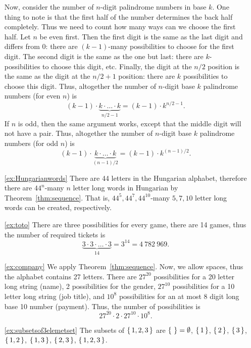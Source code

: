 \begin{enumerate}
Now, consider the number of $n$-digit palindrome numbers in base $k$.
One thing to note is that the first half of the number determines the back half completely. 
Thus we need to count how many ways can we choose the first half. 
Let $n$ be even first. 
Then the first digit is the same as the last digit and differs from 0: 
there are $(k-1)$-many possibilities to choose for the first digit. 
The second digit is the same as the one but last: 
there are $k$-possibilities to choose this digit, etc. 
Finally, the digit at the $n/2$ position is the same as the digit at the $n/2+1$ position:
there are $k$ possibilities to choose this digit. 
Thus, altogether the number of $n$-digit base $k$ palindrome numbers (for even $n$) is 
\[
(k-1) \cdot \underbrace{k \cdot \dots \cdot k}_{n/2-1} = (k-1) \cdot k^{n/2-1}. 
\]
If $n$ is odd, 
then the same argument works, except that the middle digit will not have a pair. 
Thus, altogether the number of $n$-digit base $k$ palindrome numbers (for odd $n$) is 
\[
(k-1) \cdot \underbrace{k \cdot \dots \cdot k}_{(n-1)/2} = (k-1) \cdot k^{(n-1)/2}. 
\]

\item[\ref{ex:Hungarianwords}]
There are 44 letters in the Hungarian alphabet, 
therefore there are $44^{n}$-many $n$ letter long words in Hungarian by Theorem~\ref{thm:sequence}. 
That is, $44^5 , 44^7, 44^{10}$-many %
$5, 7, 10$ letter long words can be created, respectively.

\item[\ref{ex:toto}]
There are three possibilities for every game, 
there are 14 games, 
thus the number of required tickets is
\[
\underbrace{3 \cdot 3 \cdot \dots \cdot 3}_{14} = 3^{14} = 4~782~969. 
\]

\item[\ref{ex:company}]
We apply Theorem~\ref{thm:sequence}. 
Now, we allow spaces, 
thus the alphabet contains 27 letters. 
There are $27^{20}$ possibilities for a 20 letter long string (name), 
2 possibilities for the gender, 
$27^{10}$ possibilities for a 10 letter long string (job title), 
and $10^8$ possibilities for an at most 8 digit long base 10 number (payment). 
Thus, the number of possibilities is
\[
27^{20} \cdot 2 \cdot 27^{10} \cdot 10^{8}. 
\]


\item[\ref{ex:subsetsof3elemetset}]
The subsets of $\left\{\,1, 2, 3\,\right\}$ are 
$\left\{\,\,\right\} = \emptyset$, 
$\left\{\,1\,\right\}$, $\left\{\,2\,\right\}$, $\left\{\,3\,\right\}$, 
$\left\{\,1, 2\,\right\}$, $\left\{\,1, 3\,\right\}$, $\left\{\,2, 3\,\right\}$, 
$\left\{\,1, 2, 3\,\right\}$. 


\end{enumerate}
